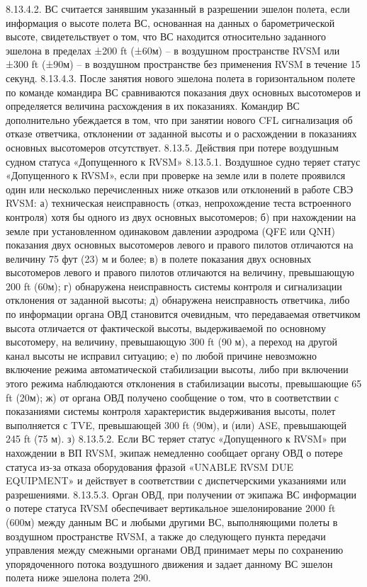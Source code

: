 8.13.4.2. ВС считается занявшим указанный в разрешении эшелон полета, если информация о высоте полета ВС, основанная на данных о барометрической высоте, свидетельствует о том, что ВС находится относительно заданного эшелона в пределах ±200 ft (±60м) – в воздушном пространстве RVSM или ±300 ft (±90м) – в воздушном пространстве без применения RVSM в течение 15 секунд.
8.13.4.3. После занятия нового эшелона полета в горизонтальном полете по команде командира ВС сравниваются показания двух основных высотомеров и определяется величина расхождения в их показаниях.
Командир ВС дополнительно убеждается в том, что при занятии нового CFL сигнализация об отказе ответчика, отклонении от заданной высоты и о расхождении в показаниях основных высотомеров отсутствует.
8.13.5.	Действия при потере воздушным судном статуса «Допущенного к RVSM»
8.13.5.1. Воздушное судно теряет статус «Допущенного к RVSM», если при проверке на земле или в полете проявился один или несколько перечисленных ниже отказов или отклонений в работе СВЭ RVSM:
а)	техническая неисправность (отказ, непрохождение теста встроенного контроля) хотя бы одного из двух основных высотомеров;
б)	при нахождении на земле при установленном одинаковом давлении аэродрома (QFE или QNH) показания двух основных высотомеров левого и правого пилотов отличаются на величину 75 фут (23) м и более;
в)	в полете показания двух основных высотомеров левого и правого пилотов отличаются на величину, превышающую 200 ft (60м);
г)	обнаружена неисправность системы контроля и сигнализации отклонения от заданной высоты;
д)	обнаружена неисправность ответчика, либо по информации органа ОВД становится очевидным, что передаваемая ответчиком высота отличается от фактической высоты, выдерживаемой по основному высотомеру, на величину, превышающую 300 ft (90 м), а переход на другой канал высоты не исправил ситуацию;
е)	по любой причине невозможно включение режима автоматической стабилизации высоты, либо при включении этого режима наблюдаются отклонения в стабилизации высоты, превышающие 65 ft (20м);
ж)	от органа ОВД получено сообщение о том, что в соответствии с показаниями системы контроля характеристик выдерживания высоты, полет выполняется с TVE, превышающей 300 ft (90м), и (или) ASE, превышающей 245 ft (75 м).
з)	8.13.5.2. Если ВС теряет статус «Допущенного к RVSM» при нахождении в ВП RVSM, экипаж немедленно сообщает органу ОВД о потере статуса из-за отказа оборудования фразой «UNABLE RVSM DUE EQUIPMENT» и действует в соответствии с диспетчерскими указаниями или разрешениями.
8.13.5.3. Орган ОВД, при получении от экипажа ВС информации о потере статуса RVSM обеспечивает вертикальное эшелонирование 2000 ft (600м) между данным ВС и любыми другими ВС, выполняющими полеты в воздушном пространстве RVSM, а также до следующего пункта передачи управления между смежными органами ОВД принимает меры по сохранению упорядоченного потока воздушного движения и задает данному ВС эшелон полета ниже эшелона полета 290.
